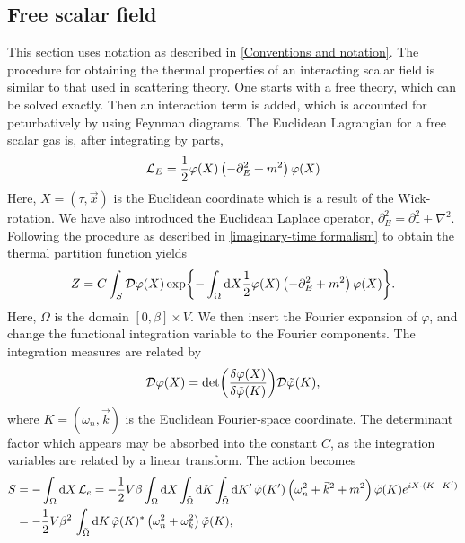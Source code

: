 \subsection{Free scalar field}
\label{section:free scalar field}
This section uses notation as described in \autoref{Conventions and notation}.
The procedure for obtaining the thermal properties of an interacting scalar field is similar to that used in scattering theory.
One starts with a free theory, which can be solved exactly.
Then an interaction term is added, which is accounted for peturbatively by using Feynman diagrams.
The Euclidean Lagrangian for a free scalar gas is, after integrating by parts,
\begin{equation}
    \mathcal{L}_E = \frac{1}{2} \varphi(X) \left( -\partial_E^2 + m^2 \right) \varphi(X)
\end{equation}
Here, $X = (\tau, \vec x)$ is the Euclidean coordinate which is a result of the Wick-rotation.
We have also introduced the Euclidean Laplace operator, $\partial_E^2 = \partial_\tau^2 + \nabla^2$.
Following the procedure as described in \autoref{imaginary-time formalism} to obtain the thermal partition function yields
\begin{equation}
    Z = C \int_S \mathcal{D} \varphi(X) 
    \exp{
        - \int_\Omega \dd X \frac{1}{2} 
        \varphi(X) \left( -\partial_E^2 + m^2 \right) \varphi(X)
    }.
\end{equation}
Here, $\Omega$ is the domain $[0, \beta] \times V$.
We then insert the Fourier expansion of $\varphi$, and change the functional integration variable to the Fourier components.
The integration measures are related by
\begin{equation*}
    \mathcal{D} \varphi(X) = \det(\frac{\delta \varphi(X)}{\delta \tilde \varphi(K)}) \mathcal{D}\tilde \varphi(K),
\end{equation*}
where $K = (\omega_n, \vec k)$ is the Euclidean Fourier-space coordinate.
The determinant factor which appears may be absorbed into the constant $C$, as the integration variables are related by a linear transform.
The action becomes 
\begin{align*}
    S & = - \int_\Omega \dd X\, \mathcal{L}_e 
    = - \frac{1}{2} V \beta \int_\Omega \dd X \int_{\tilde \Omega} \dd K \int_{\tilde \Omega} \dd K' \,
    \tilde \varphi(K') 
    \left(
        \omega_n^2 + \vec k^2 + m^2
    \right)
    \tilde \varphi(K)
    e^{iX\cdot(K - K')} \\
    & = - \frac{1}{2} V \beta^2 \, \int_{\tilde \Omega} \dd K \,
    \tilde \varphi(K)^*
    \left(
        \omega_n^2 + \omega_k^2
    \right)
    \tilde \varphi(K),
\end{align*}

